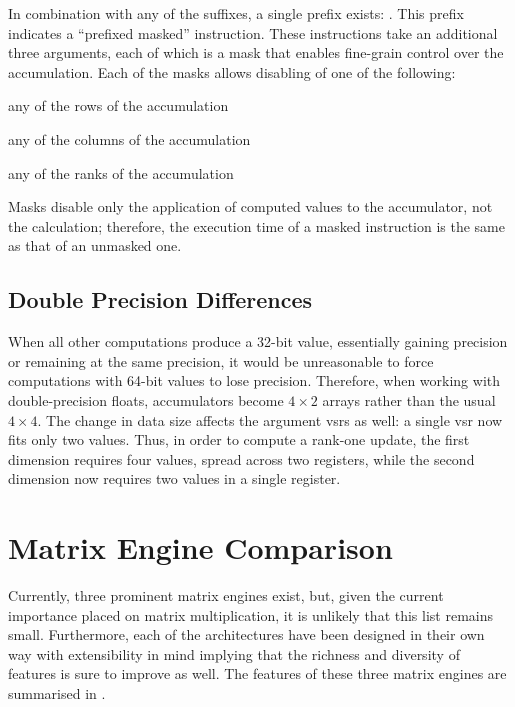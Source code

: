 \documentclass[\main/thesis.tex]{subfiles}
\begin{document}
In combination with any of the suffixes, a single prefix exists: .
This prefix indicates a ``prefixed masked'' instruction.
These instructions take an additional three arguments, each of which is a mask that enables fine-grain control over the accumulation.
Each of the masks allows disabling of one of the following:
\begin{enumerate*}[itemjoin*={{ or }}, label=\textbf{(\arabic*)}, after={.}]
  \item any of the rows of the accumulation
  \item any of the columns of the accumulation
  \item any of the ranks of the accumulation
\end{enumerate*}
Masks disable only the application of computed values to the accumulator, not the calculation; therefore, the execution time of a masked instruction is the same as that of an unmasked one.

\subsection{Double Precision Differences}
\label{sec:doubles}
When all other computations produce a 32-bit value, essentially gaining precision or remaining at the same precision, it would be unreasonable to force computations with 64-bit values to lose precision.
Therefore, when working with double-precision floats, accumulators become $4 \times 2$ arrays rather than the usual $4 \times 4$.
The change in data size affects the argument \glspl{vsr} as well: a single \gls{vsr} now fits only two values.
Thus, in order to compute a rank-one update, the first dimension requires four values, spread across two registers, while the second dimension now requires two values in a single register.

\section{Matrix Engine Comparison}
\label{sec:matrixEngines}
Currently, three prominent matrix engines exist, but, given the current importance placed on matrix multiplication, it is unlikely that this list remains small.
Furthermore, each of the architectures have been designed in their own way with extensibility in mind implying that the richness and diversity of features is sure to improve as well.
The features of these three matrix engines are summarised in .
\end{document}
